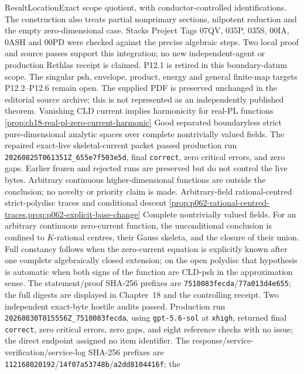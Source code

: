 \begin{AppLProvenanceLedger}{Result}{Location}{Exact scope}
{   quotient, with conductor-controlled identifications. The construction
   also treats partial nonprimary sections, nilpotent reduction and the
   empty zero-dimensional case. Stacks Project Tags 07QV, 035P, 035S,
   00IA, 0ASH and 00PD were checked against the precise algebraic steps.
   Two local proof and source passes support this integration; no new
   independent-agent or production Rethlas receipt is claimed. P12.1 is
   retired in this boundary-datum scope. The singular psh, envelope,
   product, energy and general finite-map targets P12.2--P12.6 remain open.
   The supplied PDF is preserved unchanged in the editorial source archive;
   this is not represented as an independently published theorem.}
\AppLProvenanceRecord
  {Vanishing CLD current implies harmonicity for real-PL functions}
  {\cref{prop:ch18-real-pl-zero-current-harmonic}}
  {Good separated boundaryless strict pure-dimensional analytic spaces over
   complete nontrivially valued fields.  The repaired exact-live
   skeletal-current packet passed production run
   \nolinkurl{20260825T061351Z_655e7f503e5d}, final \texttt{correct}, zero
   critical errors, and zero gaps.  Earlier frozen and rejected runs are
   preserved but do not control the live bytes.  Arbitrary continuous
   higher-dimensional functions are outside the conclusion; no novelty or
   priority claim is made.}
\AppLProvenanceRecord
  {Arbitrary-field rational-centred strict-polydisc traces and conditional
   descent}
  {\cref{prop:p062-rational-centred-traces,prop:p062-explicit-base-change}}
  {Complete nontrivially valued fields.  For an arbitrary continuous
   zero-current function, the unconditional conclusion is confined to
   \(K\)-rational centres, their Gauss skeleta, and the closure of their
   union.  Full constancy follows when the zero-current equation is explicitly
   known after one complete algebraically closed extension; on the open
   polydisc that hypothesis is automatic when both signs of the function are
   CLD-psh in the approximation sense.  The statement/proof SHA-256 prefixes
   are \texttt{7510083fecda}/\texttt{77a013d4e655}; the full digests are
   displayed in Chapter~18 and the controlling receipt.
   Two independent exact-byte hostile audits passed.  Production run
   \nolinkurl{20260830T015556Z_7510083fecda}, using
   \texttt{gpt-5.6-sol} at \texttt{xhigh}, returned final
   \texttt{correct}, zero critical errors, zero gaps, and eight reference
   checks with no issue; the direct endpoint assigned no item identifier.
   The response/service-verification/service-log SHA-256 prefixes are
   \texttt{112168020192}/\texttt{14f07a53748b}/\texttt{a2dd8104416f}; the
}
\end{AppLProvenanceLedger}
